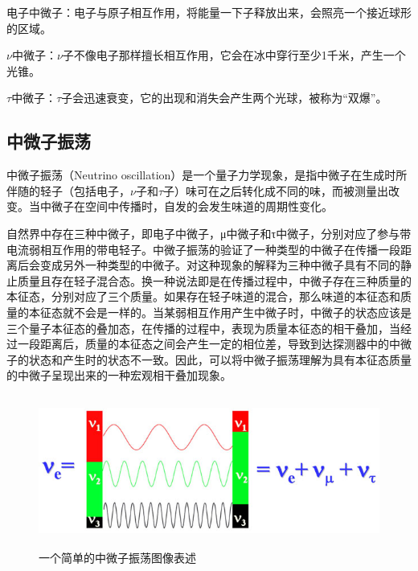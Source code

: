 \documentclass[15pt,a4paper]{article}
\begin{document}
电子中微子：电子与原子相互作用，将能量一下子释放出来，会照亮一个接近球形的区域。

$\nu$中微子：$\nu$子不像电子那样擅长相互作用，它会在冰中穿行至少1千米，产生一个光锥。

$\tau$中微子：$\tau$子会迅速衰变，它的出现和消失会产生两个光球，被称为“双爆”。

\newpage
\subsection{中微子振荡}\label{sub:sysover}
中微子振荡（Neutrino oscillation）是一个量子力学现象，是指中微子在生成时所伴随的轻子（包括电子，$\nu$子和$\tau$子）味可在之后转化成不同的味，而被测量出改变。当中微子在空间中传播时，自发的会发生味道的周期性变化。

自然界中存在三种中微子，即电子中微子，μ中微子和τ中微子，分别对应了参与带电流弱相互作用的带电轻子。中微子振荡的验证了一种类型的中微子在传播一段距离后会变成另外一种类型的中微子。对这种现象的解释为三种中微子具有不同的静止质量且存在轻子混合态。换一种说法即是在传播过程中，中微子存在三种质量的本征态，分别对应了三个质量。如果存在轻子味道的混合，那么味道的本征态和质量的本征态就不会是一样的。当某弱相互作用产生中微子时，中微子的状态应该是三个量子本征态的叠加态，在传播的过程中，表现为质量本征态的相干叠加，当经过一段距离后，质量的本征态之间会产生一定的相位差，导致到达探测器中的中微子的状态和产生时的状态不一致。因此，可以将中微子振荡理解为具有本征态质量的中微子呈现出来的一种宏观相干叠加现象。
\begin{figure}[ht]
 \centering
 \includegraphics[height=5cm]{images/中微子振荡示意图.jpg}
 \caption{一个简单的中微子振荡图像表述}
 \label{fig:singleblock}
\end{figure}
\end{document}
